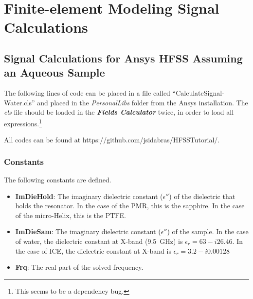 \chapter[Finite-element Modeling Signal Calculations]{Finite-element Modeling Signal Calculations}

\section*{Signal Calculations for Ansys HFSS Assuming an Aqueous Sample}

The following lines of code can be placed in a file called ``CalculateSignal-Water.cls'' and placed in the \textit{PersonalLibs} folder from the Ansys installation. The \textit{cls} file should be loaded in the \textit{\textbf{Fields Calculator}} twice, in order to load all expressions.\footnote{This seems to be a dependency bug.} 

All codes can be found at https://github.com/jsidabras/HFSSTutorial/.


\subsection*{Constants}
The following constants are defined. 
\begin{itemize}
    \item \textbf{ImDieHold}: The imaginary dielectric constant ($\epsilon''$) of the dielectric that holds the resonator. In the case of the PMR, this is the sapphire. In the case of the micro-Helix, this is the PTFE.
    \item \textbf{ImDieSam}: The imaginary dielectric constant ($\epsilon''$) of the sample. In the case of water, the dielectric constant at X-band (9.5~GHz) is $\epsilon_r = 63 - i 26.46$. In the case of ICE, the dielectric constant at X-band is $\epsilon_r = 3.2 - i 0.00128$
    \item \textbf{Frq}: The real part of the solved frequency.
\end{itemize}{}

\newpage


